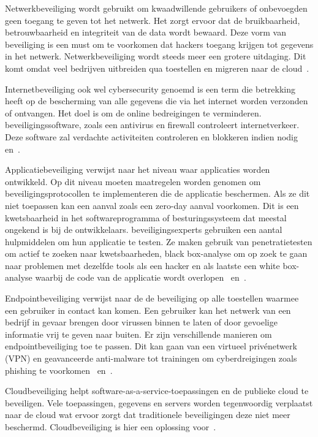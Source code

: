 Netwerkbeveiliging wordt gebruikt om kwaadwillende gebruikers of onbevoegden geen toegang te geven tot het netwerk. Het zorgt ervoor dat de bruikbaarheid, betrouwbaarheid en integriteit van de data wordt bewaard. Deze vorm van beveiliging is een must om te voorkomen dat hackers toegang krijgen tot gegevens in het netwerk. Netwerkbeveiliging wordt steeds meer een grotere uitdaging. Dit komt omdat veel bedrijven uitbreiden qua toestellen en migreren naar de cloud~\autocite{Cisco}.

Internetbeveiliging ook wel cybersecurity genoemd is een term die betrekking heeft op de bescherming van alle gegevens die via het internet worden verzonden of ontvangen. Het doel is om de online bedreigingen te verminderen. beveiligingssoftware, zoals een antivirus en firewall controleert internetverkeer. Deze software zal verdachte activiteiten controleren en blokkeren indien nodig~\autocite{Cisco} en~\autocite{Kieron2020}. 

Applicatiebeveiliging verwijst naar het niveau waar applicaties worden ontwikkeld. Op dit niveau moeten maatregelen worden genomen om beveiligingsprotocollen te implementeren die de applicatie beschermen. Als ze dit niet toepassen kan een aanval zoals een zero-day aanval voorkomen. Dit is een kwetsbaarheid in het softwareprogramma of besturingssysteem dat meestal ongekend is bij de ontwikkelaars. beveiligingsexperts gebruiken een aantal hulpmiddelen om hun applicatie te testen. Ze maken gebruik van penetratietesten om actief te zoeken naar kwetsbaarheden, black box-analyse om op zoek te gaan naar problemen met dezelfde tools als een hacker en als laatste een white box-analyse waarbij de code van de applicatie wordt overlopen~\autocite{Cisco} en~\autocite{Kieron2020}. 

Endpointbeveiliging verwijst naar de de beveiliging op alle toestellen waarmee een gebruiker in contact kan komen. Een gebruiker kan het netwerk van een bedrijf in gevaar brengen door virussen binnen te laten of door gevoelige informatie vrij te geven naar buiten. Er zijn verschillende manieren om endpointbeveiliging toe te passen. Dit kan gaan van een virtueel privénetwerk (VPN) en geavanceerde anti-malware tot trainingen om cyberdreigingen zoals phishing te voorkomen~\autocite{Cisco} en~\autocite{Kieron2020}.

Cloudbeveiliging helpt software-as-a-service-toepassingen en de publieke cloud te beveiligen. Vele toepassingen, gegevens en servers worden tegenwoordig verplaatst naar de cloud wat ervoor zorgt dat traditionele beveiligingen deze niet meer beschermd. Cloudbeveiliging is hier een oplossing voor~\autocite{Cisco}.  

